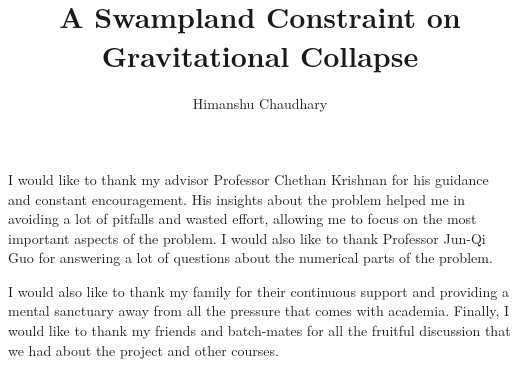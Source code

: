\documentclass[12pt]{caltech_thesis}
\begin{document}
\title{A Swampland Constraint on Gravitational Collapse}
\author{Himanshu Chaudhary}

\address{Bangalore, India}                     %



\maketitle[logo]

\begin{acknowledgements}
   I would like to thank my advisor Professor Chethan Krishnan for his guidance and constant encouragement. His insights about the problem helped me in avoiding a lot of pitfalls and wasted effort, allowing me to focus on the most important aspects of the problem. I would also like to thank Professor Jun-Qi Guo for answering a lot of questions about the numerical parts of the problem.

   I would also like to thank my family for their continuous support and providing a mental sanctuary away from all the pressure that comes with academia.
   Finally, I would like to thank my friends and batch-mates for all the fruitful discussion that we had about the project and other courses.
\end{acknowledgements}
\end{document}
